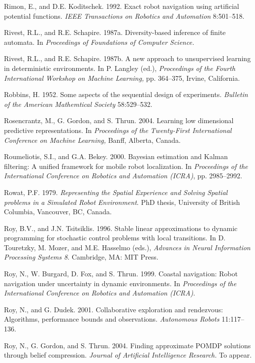 \documentclass[10pt,a4paper]{article}
\begin{document}
Rimon, E., and D.E. Koditschek. 1992. Exact robot navigation using artificial potential
functions. \textit{IEEE Transactions on Robotics and Automation} 8:501–518.

Rivest, R.L., and R.E. Schapire. 1987a. Diversity-based inference of finite automata.
In \textit{Proceedings of Foundations of Computer Science.}

Rivest, R.L., and R.E. Schapire. 1987b. A new approach to unsupervised learning in
deterministic environments. In P. Langley (ed.), \textit{Proceedings of the Fourth International
Workshop on Machine Learning,} pp. 364–375, Irvine, California.

Robbins, H. 1952. Some aspects of the sequential design of experiments. \textit{Bulletin of
the American Mathemtical Society} 58:529–532.

Rosencrantz, M., G. Gordon, and S. Thrun. 2004. Learning low dimensional predictive
representations. In \textit{Proceedings of the Twenty-First International Conference on
Machine Learning,} Banff, Alberta, Canada.

Roumeliotis, S.I., and G.A. Bekey. 2000. Bayesian estimation and Kalman filtering: A
unified framework for mobile robot localization. In \textit{Proceedings of the International
Conference on Robotics and Automation (ICRA)}, pp. 2985–2992.

Rowat, P.F. 1979. \textit{Representing the Spatial Experience and Solving Spatial problems in a
Simulated Robot Environment}. PhD thesis, University of British Columbia, Vancouver,
BC, Canada.

Roy, B.V., and J.N. Tsitsiklis. 1996. Stable linear approximations to dynamic programming
for stochastic control problems with local transitions. In D. Touretzky,
M. Mozer, and M.E. Hasselmo (eds.), \textit{Advances in Neural Information Processing Systems
8}. Cambridge, MA: MIT Press.

Roy, N., W. Burgard, D. Fox, and S. Thrun. 1999. Coastal navigation: Robot navigation
under uncertainty in dynamic environments. In \textit{Proceedings of the International
Conference on Robotics and Automation (ICRA)}.

Roy, N., and G. Dudek. 2001. Collaborative exploration and rendezvous: Algorithms,
performance bounds and observations. \textit{Autonomous Robots} 11:117–136.

Roy, N., G. Gordon, and S. Thrun. 2004. Finding approximate POMDP solutions
through belief compression. \textit{Journal of Artificial Intelligence Research.} To appear.
\end{document}

